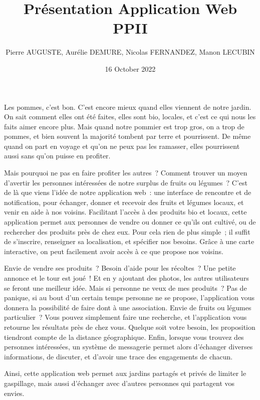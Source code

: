\documentclass{article}
\title{Présentation Application Web PPII}
\author{Pierre AUGUSTE, Aurélie DEMURE, Nicolas FERNANDEZ, Manon LECUBIN}
\date{16 October 2022}
\begin{document}
\maketitle

	Les pommes, c'est bon. C'est encore mieux quand elles viennent de notre jardin. On sait comment elles ont été faites, elles sont bio, locales, et c'est ce qui nous les faits aimer encore plus. Mais quand notre pommier est trop gros, on a trop de pommes, et bien souvent la majorité tombent par terre et pourrissent. De même quand on part en voyage et qu'on ne peux pas les ramasser, elles pourrissent aussi sans qu'on puisse en profiter.

	Mais pourquoi ne pas en faire profiter les autres ? Comment trouver un moyen d'avertir les personnes intéressées de notre surplus de fruits ou légumes ? C'est de là que viens l'idée de notre application web : une interface de rencontre et de notification, pour échanger, donner et recevoir des fruits et légumes locaux, et venir en aide à nos voisins.
	Facilitant l'accès à des produits bio et locaux, cette application permet aux personnes de vendre ou donner ce qu'ils ont cultivé, ou de rechercher des produits près de chez eux. Pour cela rien de plus simple ; il suffit de s'inscrire, renseigner sa localisation, et spécifier nos besoins. Grâce à une carte interactive, on peut facilement avoir accès à ce que propose nos voisins.

	Envie de vendre ses produits ? Besoin d'aide pour les récoltes ? Une petite annonce et le tour est joué ! Et en y ajoutant des photos, les autres utilisateurs se feront une meilleur idée. Mais si personne ne veux de mes produits ? Pas de panique, si au bout d'un certain temps personne ne se propose, l'application vous donnera la possibilité de faire dont à une association.
	Envie de fruits ou légumes particulier ? Vous pouvez simplement faire une recherche, et l'application vous retourne les résultats près de chez vous. Quelque soit votre besoin, les proposition tiendront compte de la distance géographique.
	Enfin, lorsque vous trouvez des personnes intéressées, un système de messagerie permet alors d'échanger diverses informations, de discuter, et d'avoir une trace des engagements de chacun.

	Ainsi, cette application web permet aux jardins partagés et privés de limiter le gaspillage, mais aussi d'échanger avec d'autres personnes qui partagent vos envies.
\end{document}
